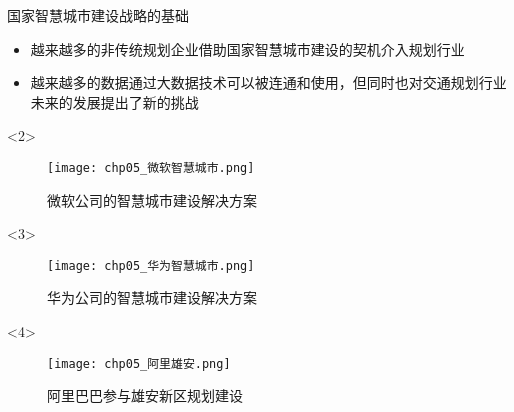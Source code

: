 \begin{frame}[t]{国家智慧城市建设战略的基础}
\begin{itemize}
\item<1-> 越来越多的非传统规划企业借助国家智慧城市建设的契机介入规划行业
\item<5-> 越来越多的数据通过大数据技术可以被连通和使用，但同时也对交通规划行业未来的发展提出了新的挑战
\end{itemize}

\begin{overlayarea}{\textwidth}{\textheight}
\vspace{-10pt}
  \begin{onlyenv}<2>
\begin{figure}
  \centering
  \texttt{[image: chp05\_微软智慧城市.png]}
  \caption{微软公司的智慧城市建设解决方案}
\end{figure}
  \end{onlyenv}

  \begin{onlyenv}<3>
\begin{figure}
  \centering
  \texttt{[image: chp05\_华为智慧城市.png]}
  \caption{华为公司的智慧城市建设解决方案}
\end{figure}
  \end{onlyenv}

  \begin{onlyenv}<4>
\begin{figure}
  \centering
  \texttt{[image: chp05\_阿里雄安.png]}
  \caption{阿里巴巴参与雄安新区规划建设}
\end{figure}
  \end{onlyenv}
\end{overlayarea}
\end{frame}



